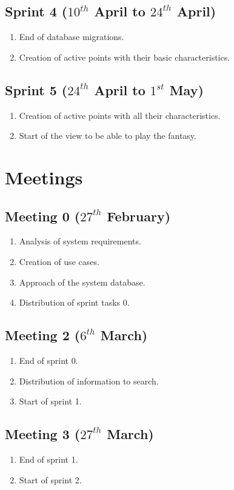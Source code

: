 \subsection{Sprint 4 ($10^{th}$ April to $24^{th}$ April)}
\begin{enumerate}
	\item End of database migrations.
	\item Creation of active points with their basic characteristics.
\end{enumerate}

\subsection{Sprint 5 ($24^{th}$ April to $1^{st}$ May)}
\begin{enumerate}
	\item Creation of active points with all their characteristics.
	\item Start of the view to be able to play the fantasy.
\end{enumerate}


\section{Meetings}
\subsection{Meeting 0 ($27^{th}$ February)}
\begin{enumerate}
	\item Analysis of system requirements.
	\item Creation of use cases.
	\item Approach of the system database.
	\item Distribution of sprint tasks 0.
\end{enumerate}

\subsection{Meeting 2 ($6^{th}$ March)}
\begin{enumerate}
	\item End of sprint 0.
	\item Distribution of information to search.
	\item Start of sprint 1.
\end{enumerate}

\subsection{Meeting 3 ($27^{th}$ March)}
\begin{enumerate}
	\item End of sprint 1.
	\item Start of sprint 2.
\end{enumerate}

